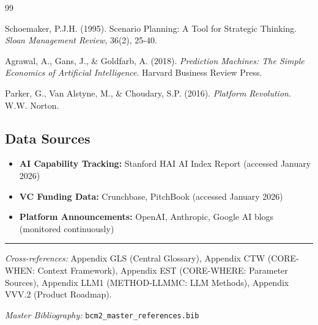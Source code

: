 \begin{thebibliography}{99}

 Schoemaker, P.J.H. (1995). Scenario Planning: A Tool for Strategic Thinking. \textit{Sloan Management Review}, 36(2), 25-40.

 Agrawal, A., Gans, J., \& Goldfarb, A. (2018). \textit{Prediction Machines: The Simple Economics of Artificial Intelligence}. Harvard Business Review Press.

 Parker, G., Van Alstyne, M., \& Choudary, S.P. (2016). \textit{Platform Revolution}. W.W. Norton.

\end{thebibliography}

\subsection{Data Sources}

\begin{itemize}[nosep]
    \item \textbf{AI Capability Tracking:} Stanford HAI AI Index Report (accessed January 2026)
    \item \textbf{VC Funding Data:} Crunchbase, PitchBook (accessed January 2026)
    \item \textbf{Platform Announcements:} OpenAI, Anthropic, Google AI blogs (monitored continuously)
\end{itemize}



\vspace{1em}
\hrule
\vspace{0.5em}

\noindent\textit{Cross-references:}
Appendix GLS (Central Glossary),
Appendix CTW (CORE-WHEN: Context Framework),
Appendix EST (CORE-WHERE: Parameter Sources),
Appendix LLM1 (METHOD-LLMMC: LLM Methods),
Appendix VVV.2 (Product Roadmap).

\noindent\textit{Master Bibliography:} \texttt{bcm2\_master\_references.bib}


